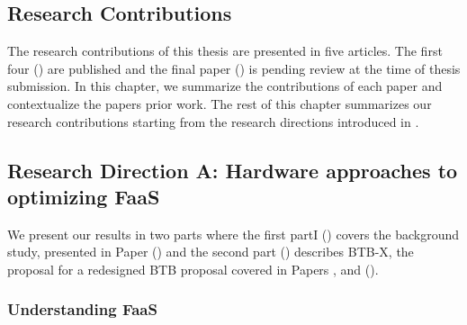 \documentclass[../main.tex]{subfiles}
\begin{document}
\ifx\chapincluded\undefined
  \begin{refsection}
 \fi

 \chapter{Research Contributions}
\label{chap:rcontrib}

The research contributions of this thesis are presented in five
articles. The first four
()
are published and the final paper () is
pending review at the time of thesis submission. In this chapter, we
summarize the contributions of each paper and contextualize the papers
prior work. The rest of this chapter summarizes our research contributions starting from the research directions introduced in .

\section{Research Direction A: Hardware approaches to optimizing FaaS}
We present our results in two parts where the first partI
() covers the
background study, presented in Paper  () and
the second part () describes BTB-X, the proposal for a
redesigned BTB proposal covered in Papers
,  and  ().

\subsection{Understanding FaaS}
\label{subsub:understanding}

\end{refsection}
\end{document}
